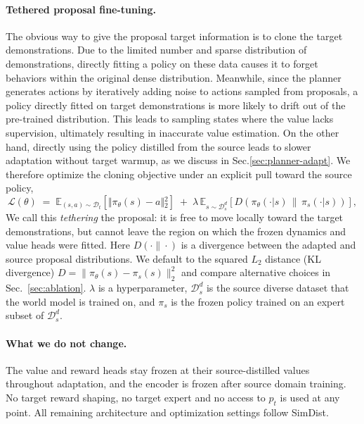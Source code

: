 \documentclass{article} %
\begin{document}
\paragraph{Tethered proposal fine-tuning.}
The obvious way to give the proposal target information is to clone the target demonstrations. Due to the limited number and sparse distribution of demonstrations, directly fitting a policy on these data causes it to forget behaviors within the original dense distribution. Meanwhile, since the planner generates actions by iteratively adding noise to actions sampled from proposals, a policy directly fitted on target demonstrations is more likely to drift out of the pre-trained distribution. This leads to sampling states where the value lacks supervision, ultimately resulting in inaccurate value estimation. On the other hand, directly using the policy distilled from the source leads to slower adaptation without target warmup, as we discuss in Sec.\ref{sec:planner-adapt}. We therefore optimize the cloning objective under an explicit pull toward the source policy,
\begin{equation}
\mathcal{L}(\theta) \;=\;
\mathbb{E}_{(s,a)\sim\mathcal{D}_t}\!\left[\Vert{}\pi_\theta(s)-a\Vert{}_2^2\right]
\;+\; \lambda \,
\mathbb{E}_{s\sim\mathcal{D}^d_s}\!\left[
D\!\left(\pi_\theta(\cdot|s)\,\|\,\pi_s(\cdot|s)\right)\right],
\label{eq:tether}
\end{equation}
We call this \emph{tethering} the proposal: it is free to move locally toward
the target demonstrations, but cannot leave the region on which the frozen
dynamics and value heads were fitted. Here $D(\cdot\|\cdot)$ is a divergence
between the adapted and source proposal distributions. We default to the squared $L_2$ distance (KL divergence) $D = \lVert\pi_\theta(s) - \pi_s(s)\rVert_2^2$ and compare alternative choices in Sec.~\ref{sec:ablation}. $\lambda$ is a hyperparameter, $\mathcal{D}^d_s$ is the source diverse dataset that the world model is trained on, and $\pi_s$ is the frozen policy trained on an expert subset of $\mathcal{D}^d_s$.

\paragraph{What we do not change.}
The value and reward heads stay frozen at their source-distilled values throughout adaptation, and the encoder is frozen after source domain training. No target reward shaping, no target expert and no access to $p_t$ is used at any point. All remaining architecture and optimization settings follow SimDist.
\end{document}
